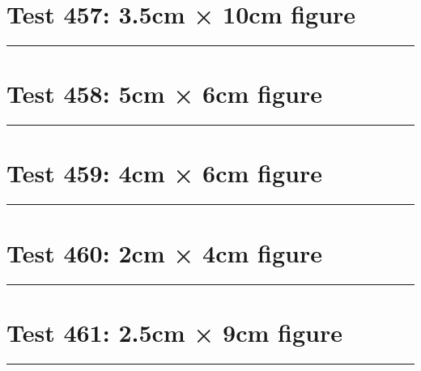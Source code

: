 \documentclass[a4paper,11pt]{article}
\begin{document}
\section*{Test 457: 3.5cm × 10cm figure}
\begin{swarmwrap}%
  \begin{minipage}[t]{3cm}
    \centering
    \rule{\linewidth}{10cm}
  \end{minipage}%
\end{swarmwrap}%
\swarmwrapnext
\lipsum[69]
\lipsum[70]
\lipsum[71]
\section*{Test 458: 5cm × 6cm figure}
\begin{swarmwrap}%
  \begin{minipage}[t]{5cm}
    \centering
    \rule{\linewidth}{6cm}
  \end{minipage}%
\end{swarmwrap}%
\swarmwrapnext
\lipsum[56]
\lipsum[57]
\lipsum[58]
\lipsum[59]
\lipsum[60]
\lipsum[61]
\section*{Test 459: 4cm × 6cm figure}
\begin{swarmwrap}%
  \begin{minipage}[t]{4cm}
    \centering
    \rule{\linewidth}{6cm}
  \end{minipage}%
\end{swarmwrap}%
\swarmwrapnext
\lipsum[53]
\lipsum[54]
\lipsum[55]
\lipsum[56]
\lipsum[57]
\lipsum[58]
\section*{Test 460: 2cm × 4cm figure}
\begin{swarmwrap}%
  \begin{minipage}[t]{2cm}
    \centering
    \rule{\linewidth}{4cm}
  \end{minipage}%
\end{swarmwrap}%
\swarmwrapnext
\lipsum[117]
\lipsum[118]
\lipsum[119]
\section*{Test 461: 2.5cm × 9cm figure}
\begin{swarmwrap}%
  \begin{minipage}[t]{2cm}
    \centering
    \rule{\linewidth}{9cm}
  \end{minipage}%
\end{swarmwrap}%
\swarmwrapnext
\lipsum[83]
\lipsum[84]
\lipsum[85]
\end{document}
